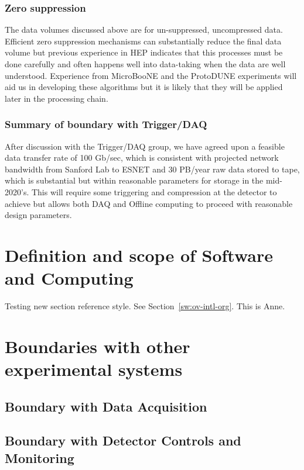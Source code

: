 \begin{enumerate}
\subsubsection{Zero suppression}

The data volumes discussed above are for un-suppressed, uncompressed data.  Efficient zero suppression mechanisms can substantially reduce the final data volume but previous experience in HEP indicates that this processes must be done carefully and often happens well into data-taking when the data are well understood.  Experience from MicroBooNE and the ProtoDUNE experiments will aid us in developing these algorithms but it is likely that they will be applied later in the processing chain.  

\subsubsection{Summary of boundary with Trigger/DAQ}

After discussion with the Trigger/DAQ group, we have agreed upon a feasible data transfer rate of 100 Gb/sec, which is consistent with projected network bandwidth from Sanford Lab to ESNET and 30 PB/year raw data stored to tape, which is substantial but within reasonable parameters for storage in the mid-2020's.  This will require some triggering and compression at the detector to achieve but allows both DAQ and Offline computing to proceed with reasonable design parameters.





\section{Definition and scope of Software and Computing}

Testing new section reference style. See Section~\ref{sw:ov-intl-org}. This is Anne.
\section{Boundaries with other experimental systems}
\subsection{Boundary with Data Acquisition}
\subsection{Boundary with Detector Controls and Monitoring}

\end{enumerate}
